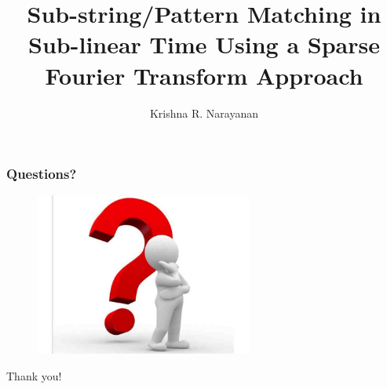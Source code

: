 \documentclass[10pt,xcolor=table]{beamer}
\begin{document}
\title{Sub-string/Pattern Matching in Sub-linear Time Using a Sparse Fourier Transform Approach}
\author{ Krishna R. Narayanan \\
}
\date{}
\frame{\titlepage}

%

\begin{frame}\frametitle{Questions?}
	\begin{figure}[t]
		\centering
		\includegraphics[width=2.8in]{questions}
	\end{figure}
	\centering
	\color{blue}
	\Huge{Thank you!}
\end{frame}
\end{document}
